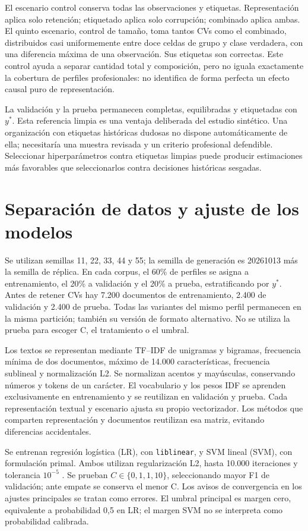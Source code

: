 El escenario control conserva todas las observaciones y etiquetas. Representación aplica solo retención; etiquetado aplica solo corrupción; combinado aplica ambas. El quinto escenario, control de tamaño, toma tantos CVs como el combinado, distribuidos casi uniformemente entre doce celdas de grupo y clase verdadera, con una diferencia máxima de una observación. Sus etiquetas son correctas. Este control ayuda a separar cantidad total y composición, pero no iguala exactamente la cobertura de perfiles profesionales: no identifica de forma perfecta un efecto causal puro de representación.

La validación y la prueba permanecen completas, equilibradas y etiquetadas con $y^*$. Esta referencia limpia es una ventaja deliberada del estudio sintético. Una organización con etiquetas históricas dudosas no dispone automáticamente de ella; necesitaría una muestra revisada y un criterio profesional defendible. Seleccionar hiperparámetros contra etiquetas limpias puede producir estimaciones más favorables que seleccionarlos contra decisiones históricas sesgadas.

\section{Separación de datos y ajuste de los modelos}
Se utilizan semillas 11, 22, 33, 44 y 55; la semilla de generación es 20261013 más la semilla de réplica. En cada corpus, el 60\% de perfiles se asigna a entrenamiento, el 20\% a validación y el 20\% a prueba, estratificando por $y^*$. Antes de retener CVs hay 7.200 documentos de entrenamiento, 2.400 de validación y 2.400 de prueba. Todas las variantes del mismo perfil permanecen en la misma partición; también su versión de formato alternativo. No se utiliza la prueba para escoger C, el tratamiento o el umbral.

Los textos se representan mediante TF--IDF de unigramas y bigramas, frecuencia mínima de dos documentos, máximo de 14.000 características, frecuencia sublineal y normalización L2. Se normalizan acentos y mayúsculas, conservando números y tokens de un carácter. El vocabulario y los pesos IDF se aprenden exclusivamente en entrenamiento y se reutilizan en validación y prueba. Cada representación textual y escenario ajusta su propio vectorizador. Los métodos que comparten representación y documentos reutilizan esa matriz, evitando diferencias accidentales.

Se entrenan regresión logística (LR), con \texttt{liblinear}, y SVM lineal (SVM), con formulación primal. Ambos utilizan regularización L2, hasta 10.000 iteraciones y tolerancia $10^{-5}$ \cite{sklearnapi}. Se prueban $C\in\{0{,}1,1,10\}$, seleccionando mayor F1 de validación; ante empate se conserva el menor C. Los avisos de convergencia en los ajustes principales se tratan como errores. El umbral principal es margen cero, equivalente a probabilidad 0,5 en LR; el margen SVM no se interpreta como probabilidad calibrada.

